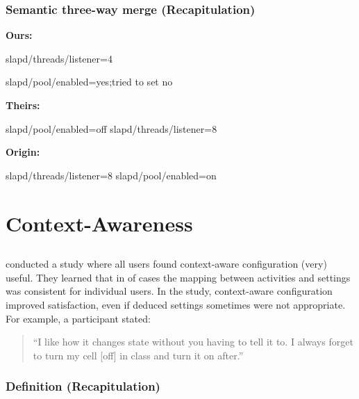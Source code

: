 \begin{frame}[fragile]
	\frametitle{Semantic three-way merge (Recapitulation)}

	\textbf{Ours:}
	\begin{code}[gobble=4,language=CfgElektra]
	slapd/threads/listener=4

	slapd/pool/enabled=yes;tried to set no
	\end{code}

	\vspace{1.5em}

	\textbf{Theirs:}
	\begin{code}[gobble=4,language=CfgElektra]
	slapd/pool/enabled=off
	slapd/threads/listener=8
	\end{code}

	\vspace{1.5em}

	\textbf{Origin:}
	\begin{code}[gobble=4,language=CfgElektra]
	slapd/threads/listener=8
	slapd/pool/enabled=on
	\end{code}
\end{frame}

\section{Context-Awareness}

\subsection{}

\begin{frame}
	\citet{khalil2005context} conducted a study where all users found context-aware configuration (very) useful.
	They learned that in  of cases the mapping between activities and settings was consistent for individual users.
	In the study, context-aware configuration improved satisfaction, even if deduced settings sometimes were not appropriate.
	For example, a participant stated:
	\vspace{2em}

	\begin{quote}
	``I like how it changes state without you having to tell it to. I always forget to turn my cell [off] in class and turn it on after.''
	\end{quote}
\end{frame}

\begin{frame}
	\frametitle{Definition (Recapitulation)}
\end{frame}

